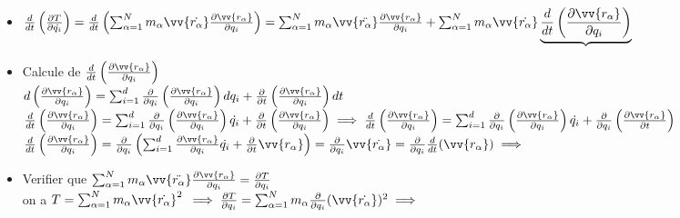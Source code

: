 \documentclass[12pt,oneside]{book}
\begin{document}
\begin{small}
\begin{itemize}
\begin{itemize}
		      \item $ \frac{d}{dt}\left( \frac{\partial T}{\partial \dot{q_i}} \right) =\frac{d}{dt}\left( \sum^N_{\alpha = 1}m_\alpha\vv{\dot{r_\alpha}}\frac{\partial \vv{r_\alpha}}{\partial q_i} \right) = \sum^N_{\alpha = 1}m_\alpha \vv{\ddot{r_\alpha}} \frac{\partial \vv{r_\alpha}}{\partial q_i} + \sum^N_{\alpha = 1}m_\alpha\vv{\dot{r_\alpha}}\underbrace{\frac{d}{dt}\left( \frac{\partial \vv{r_\alpha}}{\partial q_i} \right)}$ \\
		      \item Calcule de $\frac{d}{dt}\left( \frac{\partial \vv{r_\alpha}}{\partial q_i} \right)$ \\
		            $d\left( \frac{\partial \vv{r_\alpha}}{\partial q_i} \right) = \sum^d_{i=1}\frac{\partial}{\partial q_i} \left( \frac{\partial \vv{r_\alpha}}{\partial q_i} \right)dq_i + \frac{\partial}{\partial t}\left( \frac{\partial \vv{r_\alpha}}{\partial q_i} \right)dt$\\
		            $\frac{d}{dt}\left( \frac{\partial \vv{r_\alpha}}{\partial q_i} \right) = \sum^d_{i=1}\frac{\partial}{\partial q_i} \left( \frac{\partial \vv{r_\alpha}}{\partial q_i} \right)\dot{q_i} + \frac{\partial}{\partial t}\left( \frac{\partial \vv{r_\alpha}}{\partial q_i} \right) \implies \frac{d}{dt}\left( \frac{\partial \vv{r_\alpha}}{\partial q_i} \right) = \sum^d_{i=1}\frac{\partial}{\partial q_i} \left( \frac{\partial \vv{r_\alpha}}{\partial q_i} \right)\dot{q_i} + \frac{\partial}{\partial q_i}\left( \frac{\partial \vv{r_\alpha}}{\partial t} \right)$\\
		            $\frac{d}{dt}\left( \frac{\partial \vv{r_\alpha}}{\partial q_i} \right) = \frac{\partial}{\partial q_i} \left( \sum^d_{i=1} \frac{\partial\vv{r_\alpha}}{\partial q_i} \dot{q_i} + \frac{\partial}{\partial t}\vv{r_\alpha} \right) = \frac{\partial}{\partial q_i}\vv{\dot{r_\alpha}} = \frac{\partial}{\partial q_i}\frac{d}{dt}(\vv{r_\alpha}) \implies $  \\
		      \item Verifier que $\sum^N_{\alpha = 1}m_\alpha \vv{\ddot{r_\alpha}} \frac{\partial \vv{r_\alpha}}{\partial q_i} = \frac{\partial T}{\partial q_i} $\\
		            on a $T = \sum^N_{\alpha =1 }m_\alpha\vv{\dot{r_\alpha}}^2 $
		            $\implies \frac{\partial T}{\partial q_i} =  \sum^N_{\alpha =1 }m_\alpha\frac{\partial}{\partial q_i}(\vv{\dot{r_\alpha}})^2 \implies$

\end{itemize}
\end{itemize}
\end{small}
\end{document}
